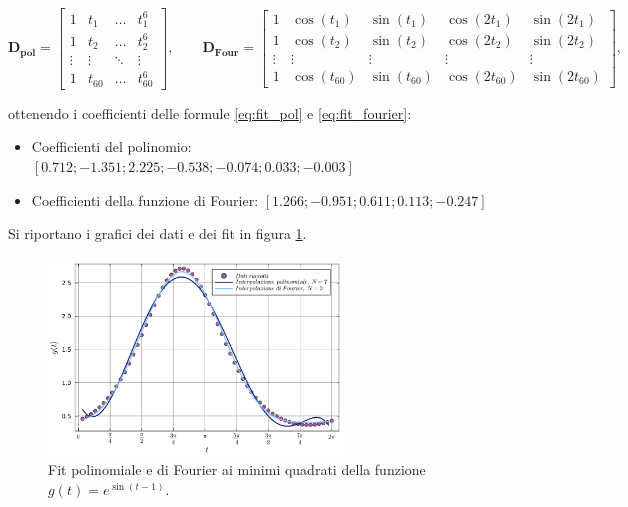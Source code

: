 \documentclass[letterpaper, 12pt]{article}
\numberwithin{equation}{section}    %
\begin{document}
\begin{equation*}
    \mathbf{D_{pol}} = \begin{bmatrix}
        1 & t_1 & \hdots & t_1^6 \\
        1 & t_2 & \hdots & t_2^6 \\
        \vdots & \vdots & \ddots& \vdots \\
        1 & t_{60} & \hdots & t_{60}^6
    \end{bmatrix},
    \qquad
    \mathbf{D_{Four}} = \begin{bmatrix}
        1 & \cos(t_1) & \sin(t_1) & \cos(2t_1) & \sin(2t_1) \\
        1 & \cos(t_2) & \sin(t_2) & \cos(2t_2) & \sin(2t_2) \\
        \vdots & \vdots & \vdots & \vdots & \vdots \\
        1 & \cos(t_{60}) & \sin(t_{60}) & \cos(2t_{60}) & \sin(2t_{60})
    \end{bmatrix},
\end{equation*}

ottenendo i coefficienti delle formule \ref{eq:fit_pol} e \ref{eq:fit_fourier}:
\begin{itemize}
    \item Coefficienti del polinomio: $[0.712; -1.351; 2.225; -0.538; -0.074; 0.033; -0.003]$
    \item Coefficienti della funzione di Fourier: $[1.266; -0.951; 0.611; 0.113; -0.247]$
\end{itemize}

Si riportano i grafici dei dati e dei fit in figura \ref{fig:es2_6_3_1}.
\begin{figure}[!ht]
    \centering
    \includegraphics[width=0.7\textwidth]{2631.pdf}
    \caption{Fit polinomiale e di Fourier ai minimi quadrati della funzione $g(t)=e^{\sin(t-1)}$.}
    \label{fig:es2_6_3_1}
\end{figure}
\end{document}
